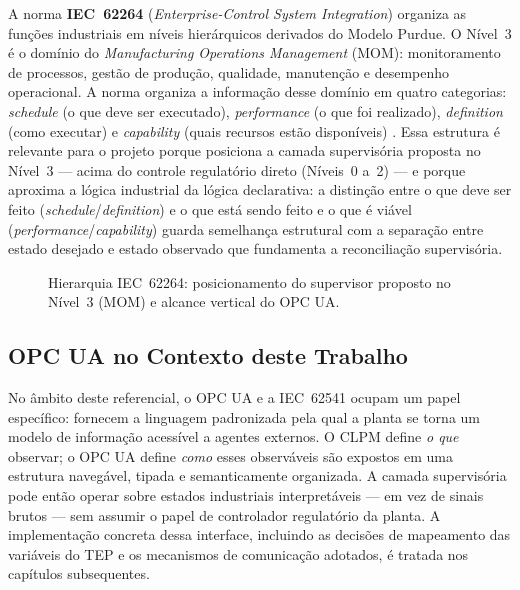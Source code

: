 A norma \textbf{IEC~62264} \cite{IEC62264} (\textit{Enterprise-Control System Integration}) organiza as funções industriais em níveis hierárquicos derivados do Modelo Purdue. O Nível~3 é o domínio do \textit{Manufacturing Operations Management} (MOM): monitoramento de processos, gestão de produção, qualidade, manutenção e desempenho operacional. A norma organiza a informação desse domínio em quatro categorias: \textit{schedule} (o que deve ser executado), \textit{performance} (o que foi realizado), \textit{definition} (como executar) e \textit{capability} (quais recursos estão disponíveis) \cite{IEC62264}. Essa estrutura é relevante para o projeto porque posiciona a camada supervisória proposta no Nível~3 --- acima do controle regulatório direto (Níveis~0 a~2) --- e porque aproxima a lógica industrial da lógica declarativa: a distinção entre o que deve ser feito (\textit{schedule}/\textit{definition}) e o que está sendo feito e o que é viável (\textit{performance}/\textit{capability}) guarda semelhança estrutural com a separação entre estado desejado e estado observado que fundamenta a reconciliação supervisória.

\begin{figure}[htbp]
	\centering
	\caption{Hierarquia IEC~62264: posicionamento do supervisor proposto no Nível~3 (MOM) e alcance vertical do OPC UA.}
	\label{fig:iec62264_pyramid}
\end{figure}

\subsection{OPC UA no Contexto deste Trabalho}

No âmbito deste referencial, o OPC UA e a IEC~62541 ocupam um papel específico: fornecem a linguagem padronizada pela qual a planta se torna um modelo de informação acessível a agentes externos. O CLPM define \textit{o que} observar; o OPC UA define \textit{como} esses observáveis são expostos em uma estrutura navegável, tipada e semanticamente organizada. A camada supervisória pode então operar sobre estados industriais interpretáveis --- em vez de sinais brutos --- sem assumir o papel de controlador regulatório da planta. A implementação concreta dessa interface, incluindo as decisões de mapeamento das variáveis do TEP e os mecanismos de comunicação adotados, é tratada nos capítulos subsequentes.

